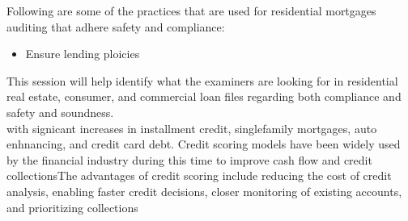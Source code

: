 Following are some of the practices that are used for residential mortgages auditing that adhere safety and compliance:
\begin{itemize}
\item Ensure lending ploicies   
\end{itemize}

This session will help identify what the examiners are looking for in residential real estate, consumer, and commercial loan files regarding both compliance and safety and soundness.\\



with signicant increases in installment credit, singlefamily mortgages, auto enhnancing, and credit card debt. Credit scoring models have been widely used by the financial industry during this time to improve cash flow and credit collectionsThe advantages of credit scoring include reducing the cost of credit analysis, enabling faster credit decisions, closer monitoring of existing accounts, and prioritizing collections
 